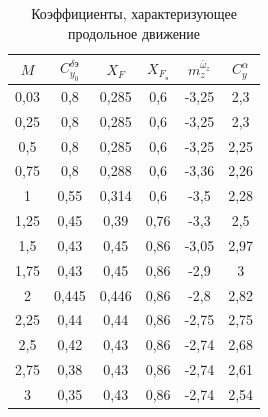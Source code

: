 \begin{table}[H]
    \centering
    \caption{Коэффициенты, характеризующее продольное движение}
    \label{tab:Коэффициенты, характеризующее продольное движение}
    \begin{tabular}{|c||c|c|c|c|c|}
    \hline
        $M$ & $C_{y_0}^{\delta \text{э}}$ &$X_F$ & $X_F_{\text{э}}$ &$m_z^{\bar{\omega}_z}$ & $C_y^{\alpha}$ \\ \hline \hline
        0,03  & 0,8  & 0,285  & 0,6  & -3,25 & 2,3 \\ \hline
        0,25  & 0,8  & 0,285  & 0,6  & -3,25 &2,3 \\ \hline
        0,5  & 0,8  & 0,285  & 0,6  & -3,25 & 2,25\\ \hline
        0,75  & 0,8  & 0,288  & 0,6  & -3,36 & 2,26\\ \hline
        1  & 0,55  & 0,314  & 0,6  & -3,5 &2,28 \\ \hline
        1,25  & 0,45  & 0,39  & 0,76  & -3,3 &2,5 \\ \hline
        1,5  & 0,43  & 0,45  & 0,86  & -3,05 &2,97 \\ \hline
        1,75  & 0,43  & 0,45  & 0,86  & -2,9 & 3\\ \hline
        2  & 0,445  & 0,446  & 0,86  & -2,8 & 2,82\\ \hline
        2,25  & 0,44  & 0,44  & 0,86  & -2,75 & 2,75\\ \hline
        2,5  & 0,42  & 0,43  & 0,86  & -2,74 & 2,68\\ \hline
        2,75  & 0,38  & 0,43  & 0,86  & -2,74 & 2,61\\ \hline
        3  & 0,35  & 0,43  & 0,86  & -2,74 & 2,54\\ \hline
    \end{tabular}
\end{table}

